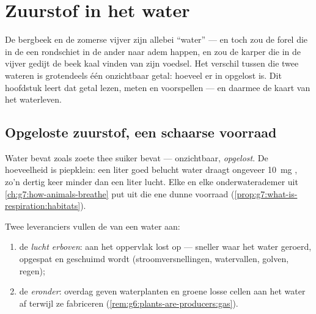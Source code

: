\chapter{Zuurstof in het water}\label{ch:g7:oxygen-in-the-water}

De bergbeek en de zomerse vijver zijn allebei ``water'' --- en toch zou de
forel die in de een rondschiet in de ander naar adem happen, en zou de
karper die in de vijver gedijt de beek kaal vinden van zijn voedsel. Het
verschil tussen die twee wateren is grotendeels één onzichtbaar getal:
hoeveel  er in opgelost is. Dit hoofdstuk leert dat getal lezen,
meten en voorspellen --- en daarmee de kaart van het waterleven.

\section{Opgeloste zuurstof, een schaarse voorraad}

\begin{definition}\label{def:g7:oxygen-in-the-water:dissolved}
Water bevat  zoals zoete thee suiker bevat --- onzichtbaar,
\emph{opgelost}. De hoeveelheid is piepklein:
een liter goed belucht water draagt ongeveer \qty{10}{mg} , zo'n
dertig keer minder dan een liter lucht. Elke  en elke onderwaterademer
uit \cref{ch:g7:how-animals-breathe} put uit die ene dunne voorraad
(\cref{prop:g7:what-is-respiration:habitats}).
\end{definition}

\begin{proposition}\label{prop:g7:oxygen-in-the-water:fills}
Twee leveranciers vullen de  van een water aan:
\begin{enumerate}
  \item de \emph{lucht erboven}: aan het oppervlak lost  op ---
        sneller waar het water geroerd, opgespat en geschuimd wordt
        (stroomversnellingen, watervallen, golven, regen);
  \item de \emph{ eronder}: overdag geven waterplanten en
        groene losse cellen  aan het water af terwijl ze
        fabriceren (\cref{rem:g6:plants-are-producers:gas}).
\end{enumerate}
\end{proposition}
\admitted

